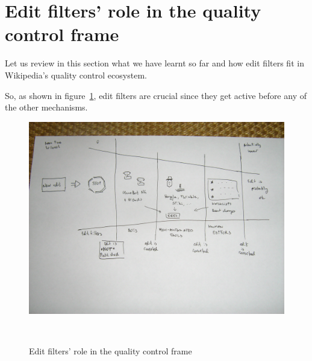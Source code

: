 
\section{Edit filters' role in the quality control frame}

Let us review in this section what we have learnt so far and how edit filters fit in Wikipedia's quality control ecosystem.

So, as shown in figure~\ref{fig:funnel-with-filters}, edit filters are crucial since they get active before any of the other mechanisms.

\begin{figure}
\centering
  \includegraphics[width=0.9\columnwidth]{pics/funnel-diagramm-with-filters.JPG}
  \caption{Edit filters' role in the quality control frame}~\label{fig:funnel-with-filters}
\end{figure}

